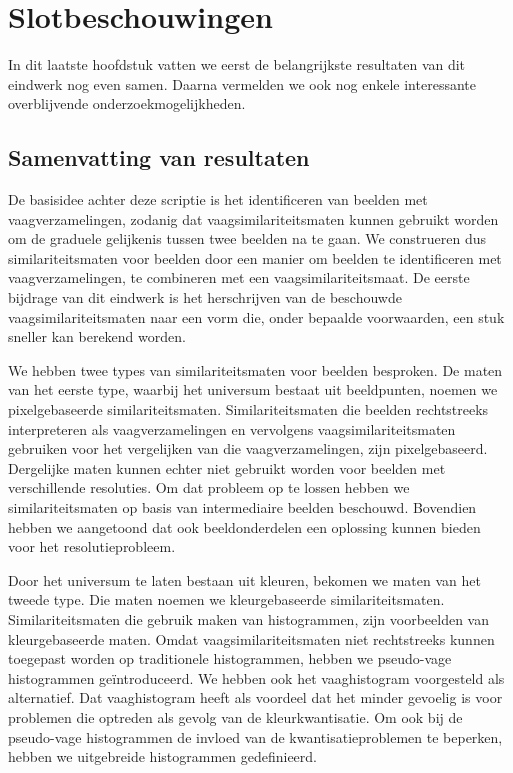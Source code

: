 \chapter{Slotbeschouwingen}

In dit laatste hoofdstuk vatten we eerst de belangrijkste resultaten van dit eindwerk
nog even samen. Daarna vermelden we ook nog enkele interessante overblijvende
onderzoekmogelijkheden.

\section{Samenvatting van resultaten}

De basisidee achter deze scriptie is het identificeren van beelden
met vaagverzamelingen, zodanig dat vaagsimilariteitsmaten kunnen gebruikt worden
om de graduele gelijkenis tussen twee beelden na te gaan. 
We construeren dus similariteitsmaten voor beelden door een manier om beelden te
identificeren met vaagverzamelingen, te combineren met een vaagsimilariteitsmaat.
De eerste bijdrage van dit eindwerk is het herschrijven van de beschouwde
vaagsimilariteitsmaten naar een vorm die, onder bepaalde voorwaarden, een stuk
sneller kan berekend worden. 

We hebben twee types van similariteitsmaten voor beelden besproken.
De maten van het eerste type, waarbij het universum bestaat uit beeldpunten, 
noemen we pixelgebaseerde similariteitsmaten. Similariteitsmaten die 
beelden rechtstreeks interpreteren als vaagverzamelingen en vervolgens 
vaagsimilariteitsmaten gebruiken voor het vergelijken van die vaagverzamelingen, 
zijn pixelgebaseerd. Dergelijke maten kunnen echter niet gebruikt worden voor 
beelden met verschillende resoluties. Om dat probleem op te lossen hebben we 
similariteitsmaten op basis van intermediaire beelden beschouwd. Bovendien 
hebben we aangetoond dat ook beeldonderdelen een oplossing kunnen bieden voor 
het resolutieprobleem. 

Door het universum te laten bestaan uit kleuren, bekomen we maten van het tweede
type. Die maten noemen we kleurgebaseerde similariteitsmaten. Similariteitsmaten
die gebruik maken van histogrammen, zijn voorbeelden van kleurgebaseerde 
maten. Omdat vaagsimilariteitsmaten niet rechtstreeks kunnen
toegepast worden op traditionele histogrammen, hebben we pseudo-vage histogrammen
ge\"introduceerd. We hebben ook het vaaghistogram voorgesteld als alternatief.
Dat vaaghistogram heeft als voordeel dat het minder gevoelig is voor
problemen die optreden als gevolg van de kleurkwantisatie. Om ook bij de pseudo-vage
histogrammen de invloed van de kwantisatieproblemen te beperken, hebben we 
uitgebreide histogrammen gedefinieerd. 

